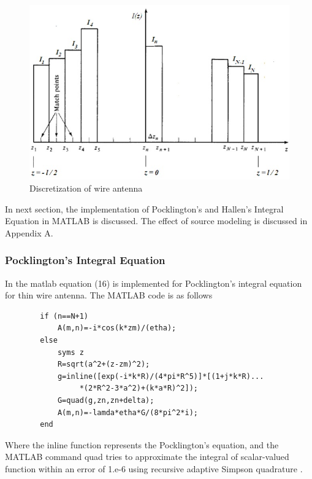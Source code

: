 \documentclass[aps,prstab,twocolumn,superscriptaddress,groupedaddress,showkeys,nofootinbib]{revtex4}  %
\begin{document}
\begin{figure}[here!]
\centering
\includegraphics[scale=0.45]{image2.jpg}
\caption{Discretization of wire antenna}
\end{figure}
In next section, the implementation of Pocklington's and Hallen's Integral Equation in MATLAB is discussed. The effect of source modeling is discussed in Appendix A. 
\vspace{-5mm}
\subsubsection{Pocklington's Integral Equation}
In the matlab equation (16) is implemented for Pocklington's integral equation for thin wire antenna. The MATLAB code is as follows
\begin{lstlisting}
        if (n==N+1)
            A(m,n)=-i*cos(k*zm)/(etha);
        else
            syms z
            R=sqrt(a^2+(z-zm)^2);
            g=inline([exp(-i*k*R)/(4*pi*R^5)]*[(1+j*k*R)...
                 *(2*R^2-3*a^2)+(k*a*R)^2]);
            G=quad(g,zn,zn+delta);
            A(m,n)=-lamda*etha*G/(8*pi^2*i);
        end
\end{lstlisting}
Where the inline function represents the Pocklington's equation, and the MATLAB command quad tries to approximate the integral of scalar-valued function within an error of 1.e-6 using recursive adaptive Simpson quadrature \cite{matlab}.
\vspace{-5mm}
\end{document}
